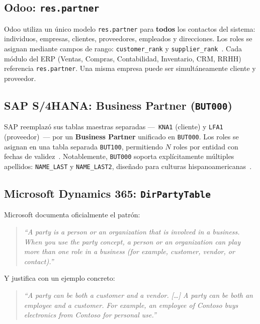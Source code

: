 \documentclass[conference]{IEEEtran}
\begin{document}
\subsection{Odoo: \texttt{res.partner}}

Odoo utiliza un \'unico modelo \texttt{res.partner} para
\textbf{todos} los contactos del sistema: individuos, empresas,
clientes, proveedores, empleados y direcciones. Los roles se
asignan mediante campos de rango: \texttt{customer\_rank} y
\texttt{supplier\_rank}~\cite{odoo_partner}. Cada m\'odulo del
ERP (Ventas, Compras, Contabilidad, Inventario, CRM, RRHH)
referencia \texttt{res.partner}. Una misma empresa puede ser
simult\'aneamente cliente y proveedor.

\subsection{SAP S/4HANA: Business Partner (\texttt{BUT000})}

SAP reemplaz\'o sus tablas maestras separadas
---~\texttt{KNA1} (cliente) y \texttt{LFA1}
(proveedor)~--- por un \textbf{Business Partner} unificado en
\texttt{BUT000}. Los roles se asignan en una tabla separada
\texttt{BUT100}, permitiendo $N$ roles por entidad con fechas de
validez~\cite{sap_bp}. Notablemente, \texttt{BUT000} soporta
expl\'icitamente m\'ultiples apellidos: \texttt{NAME\_LAST} y
\texttt{NAME\_LAST2}, dise\~nado para culturas
hispanoamericanas~\cite{sap_but000}.

\subsection{Microsoft Dynamics 365: \texttt{DirPartyTable}}

Microsoft documenta oficialmente el patr\'on:

\begin{quote}
\textit{``A party is a person or an organization that is involved
in a business. When you use the party concept, a person or an
organization can play more than one role in a business (for
example, customer, vendor, or contact).''}~\cite{ms_dynamics}
\end{quote}

Y justifica con un ejemplo concreto:

\begin{quote}
\textit{``A party can be both a customer and a vendor. [\ldots]
A party can be both an employee and a customer. For example, an
employee of Contoso buys electronics from Contoso for personal
use.''}~\cite{ms_dynamics}
\end{quote}
\end{document}
